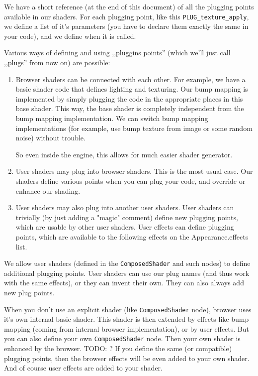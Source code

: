 \documentclass{acmsiggraph}                     %
\newenvironment{myenumerate}
{\begin{enumerate}
  \setlength{\itemsep}{0pt}
  \setlength{\parskip}{0pt}
  \setlength{\parsep}{0pt}}
{\end{enumerate}}
\begin{document}
We have a short reference (at the end of this document) of all
the plugging points available in our shaders. For each plugging point,
like this \texttt{PLUG\_texture\_apply}, we define a list of it's parameters
(you have to declare them exactly the same in your code), and we define
when it is called.

Various ways of defining and using ,,pluggins points'' (which we'll just call
,,plugs'' from now on) are possible:

\begin{myenumerate}
\itemsep 0pt
\item Browser shaders can be connected with each other. For example, we
have a basic shader code that defines lighting and texturing. Our bump
mapping is implemented by simply plugging the code in the appropriate
places in this base shader. This way, the base shader is completely
independent from the bump mapping implementation. We can switch bump
mapping implementations (for example, use bump texture from image or
some random noise) without trouble.

So even inside the engine, this allows for much easier shader generator.

\item User shaders may plug into browser shaders. This is the most usual
case. Our shaders define various points when you can plug your code,
and override or enhance our shading.

\item User shaders may also plug into another user shaders. User shaders
can trivially (by just adding a "magic" comment) define new plugging
points, which are usable by other user shaders. User effects can
define plugging points, which are available to the following effects
on the Appearance.effects list.

\end{myenumerate}

We allow user shaders (defined in the \texttt{ComposedShader} and such nodes) to
define additional plugging points. User shaders can use our plug names
(and thus work with the same effects), or they can invent their
own. They can also always add new plug points.

When you don't use an explicit shader (like \texttt{ComposedShader} node),
browser uses it's own internal basic shader. This shader is then
extended by effects like bump mapping (coming from internal browser
implementation), or by user effects. But you can also define your own
\texttt{ComposedShader} node. Then your own shader is enhanced by the
browser. TODO: ? If you define the same (or compatible) plugging
points, then the browser effects will be even added to your own
shader. And of course user effects are added to your shader.
\end{document}
